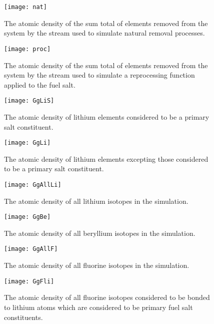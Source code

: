 \begin{figure}[H]
    \centering
    \texttt{[image: nat]}
    \caption{The atomic density of the sum total of elements removed from the
    system by the stream used to simulate natural removal processes.}
    \label{fig:nat}
\end{figure}

\begin{figure}[H]
    \centering
    \texttt{[image: proc]}
    \caption{The atomic density of the sum total of elements removed from the
    system by the stream used to simulate a reprocessing function applied to
    the fuel salt.}
    \label{fig:proc}
\end{figure}

\begin{figure}[H]
    \centering
    \texttt{[image: GgLiS]}
    \caption{The atomic density of lithium elements considered to be a primary
    salt constituent.}
    \label{fig:GgLiS}
\end{figure}

\begin{figure}[H]
    \centering
    \texttt{[image: GgLi]}
    \caption{The atomic density of lithium elements excepting those considered 
    to be a primary salt constituent.}
    \label{fig:GgLi}
\end{figure}

\begin{figure}[H]
    \centering
    \texttt{[image: GgAllLi]}
    \caption{The atomic density of all lithium isotopes in the simulation.} 
    \label{fig:GgAllLi}
\end{figure}

\begin{figure}[H]
    \centering
    \texttt{[image: GgBe]}
    \caption{The atomic density of all beryllium isotopes in the simulation.} 
    \label{fig:GgBe}
\end{figure}

\begin{figure}[H]
    \centering
    \texttt{[image: GgAllF]}
    \caption{The atomic density of all fluorine isotopes in the simulation.} 
    \label{fig:GgAllF}
\end{figure}

\begin{figure}[H]
    \centering
    \texttt{[image: GgFli]}
    \caption{The atomic density of all fluorine isotopes considered to be bonded
    to lithium atoms which are considered to be primary fuel salt constituents.}
    \label{fig:GgFli}
\end{figure}

